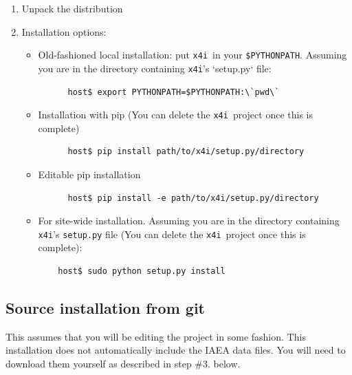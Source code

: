 \documentclass[11pt]{article}
\newcommand{\xfouri}{\texttt{x4i}}
\begin{document}
\begin{enumerate}
\item Unpack the distribution

\item Installation options:
  \begin{itemize}
  \item Old-fashioned local installation: put \xfouri\ in your \texttt{\$PYTHONPATH}.  Assuming you are in the directory containing \xfouri's `setup.py` file:
    \begin{verbatim}
      host$ export PYTHONPATH=$PYTHONPATH:\`pwd\`
    \end{verbatim}

  \item Installation with pip (You can delete the \xfouri\ project once this is complete)
    \begin{verbatim}
      host$ pip install path/to/x4i/setup.py/directory
    \end{verbatim}

  \item Editable pip installation
    \begin{verbatim}
      host$ pip install -e path/to/x4i/setup.py/directory
    \end{verbatim}

  \item For site-wide installation.  Assuming you are in the directory containing \xfouri's \texttt{setup.py} file (You can delete the \xfouri\ project once this is complete):
    \begin{verbatim}
    host$ sudo python setup.py install
    \end{verbatim}

  \end{itemize}

\end{enumerate}

\subsection{Source installation from git}

This assumes that you will be editing the project in some fashion.
This installation does not automatically include the IAEA data files.
You will need to download them yourself as described in step \#3. below.
\end{document}
